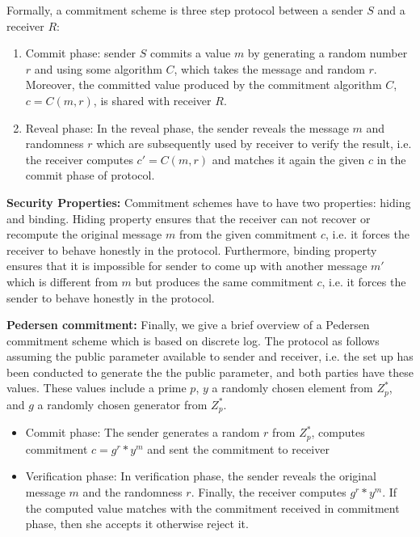 \begin{enumerate}
{      
      Formally, a commitment scheme is three step protocol between a sender $S$ and a receiver $R$:
      \begin{enumerate}
      \item Commit phase: sender $S$ commits a value $m$ by generating a random number $r$ and using some algorithm $C$, which takes the message 
      and random $r$. Moreover, the committed value produced by the commitment algorithm $C$, $c = C(m, r)$, is shared with receiver $R$.
      \item Reveal phase: In the reveal phase, the sender reveals the message $m$ and randomness $r$ which are subsequently used by 
         receiver to verify the result, i.e. the receiver computes  $c' = C(m, r)$ and matches it again the given $c$ in the commit phase of protocol. 
      \end{enumerate}
      
      
    \textbf{Security Properties:} 
     Commitment schemes have to have two properties: hiding and binding. Hiding property ensures that 
     the receiver can not recover or recompute the original message $m$ from the given commitment $c$, i.e. 
     it forces the receiver to behave honestly in the protocol. 
     Furthermore, binding property ensures that it is impossible for sender to come up with 
     another message $m'$ which is different from $m$ but produces the same commitment $c$, i.e. 
     it forces the sender to behave honestly in the protocol. 
     
    \textbf{Pedersen commitment:}
     Finally, we give a brief overview of a Pedersen commitment scheme which is based on discrete log.  The protocol as follows assuming 
     the public parameter available to sender and receiver, i.e. the set up has been conducted to generate the the public parameter, 
     and both parties have these values. These values include a prime $p$, $y$ a randomly chosen element from $Z_{p}^{*}$, and $g$ 
     a randomly chosen generator from   $Z_{p}^{*}$.  
     
     \begin{itemize}
     \item Commit phase: The sender generates a random $r$ from $Z_{p}^{*}$, computes commitment $c = g^{r}*y^{m}$ and sent the commitment to 
        receiver
      \item Verification phase: In verification phase, the sender reveals the original message $m$ and the randomness $r$. Finally, 
            the receiver computes  $g^{r}*y^{m}$. If the computed  value matches with the commitment received in 
            commitment phase, then she accepts it otherwise reject it. 
     

\end{itemize}}
\end{enumerate}

